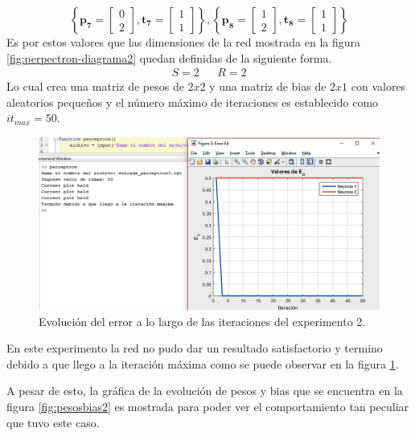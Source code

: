 \documentclass[12pt, titlepage]{article}
\begin{document}
\[ \left\lbrace \boldsymbol{p_7} = \left[\begin{array}{c} 0\\ 2\end{array}\right], \boldsymbol{t_7} = \left[\begin{array}{c} 1\\ 1\end{array}\right]  \right\rbrace, \left\lbrace \boldsymbol{p_8} = \left[\begin{array}{c} 1\\ 2\end{array}\right], \boldsymbol{t_8} = \left[\begin{array}{c} 1\\ 1\end{array}\right]  \right\rbrace\]
Es por estos valores que las dimensiones de la red mostrada en la figura \ref{fig:perpectron-diagrama2} quedan definidas de la siguiente forma.
\begin{align*}
S = 2 && R = 2
\end{align*}
Lo cual crea una matriz de pesos de $2x2$ y una matriz de bias de $2x1$ con valores aleatorios pequeños y el número máximo de iteraciones es establecido como $it_{max}=50$.
\begin{figure}[H]
    \begin{center}
        \includegraphics[width=15cm]{img/perceptron2/error.png}
        \caption{Evolución del error a lo largo de las iteraciones del experimento 2.}
        \label{fig:error2}
    \end{center}
\end{figure}
En este experimento la red no pudo dar un resultado satisfactorio y termino debido a que llego a la iteración máxima como se puede observar en la figura \ref{fig:error2}.

A pesar de esto, la gráfica de la evolución de pesos y bias que se encuentra en la figura \ref{fig:pesosbias2} es mostrada para poder ver el comportamiento tan peculiar que tuvo este caso.
\end{document}

